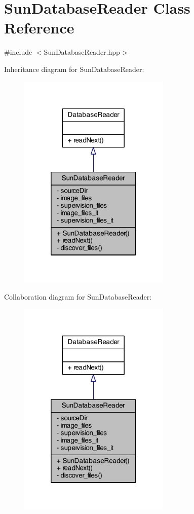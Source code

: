 \hypertarget{class_sun_database_reader}{\section{Sun\+Database\+Reader Class Reference}
\label{class_sun_database_reader}
}


{\ttfamily \#include $<$Sun\+Database\+Reader.\+hpp$>$}



Inheritance diagram for Sun\+Database\+Reader\+:
\nopagebreak
\begin{figure}[H]
\begin{center}
\leavevmode
\includegraphics[width=205pt]{class_sun_database_reader__inherit__graph}
\end{center}
\end{figure}


Collaboration diagram for Sun\+Database\+Reader\+:
\nopagebreak
\begin{figure}[H]
\begin{center}
\leavevmode
\includegraphics[width=205pt]{class_sun_database_reader__coll__graph}
\end{center}
\end{figure}

